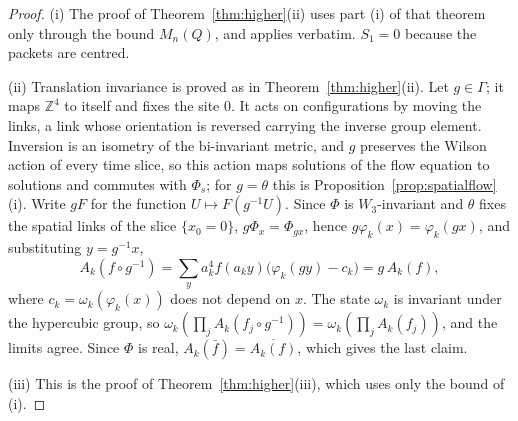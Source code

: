 \documentclass[aps,prd,twocolumn,superscriptaddress,nofootinbib,longbibliography,floatfix,amsmath,amssymb,10pt]{revtex4-2}
\theoremstyle{definition}
\theoremstyle{remark}
\newcommand{\Z}{\mathbb{Z}}
\begin{document}
\begin{proof}
(i) The proof of Theorem~\ref{thm:higher}(ii) uses part (i) of that theorem
only through the bound $M_n(Q)$, and applies verbatim. $S_1=0$ because the
packets are centred.

(ii) Translation invariance is proved as in Theorem~\ref{thm:higher}(ii). Let
$g\in\Gamma$; it maps $\Z^4$ to itself and fixes the site $0$. It acts on
configurations by moving the links, a link whose orientation is reversed
carrying the inverse group element. Inversion is an isometry of the
bi-invariant metric, and $g$ preserves the Wilson action of every time
slice, so this action maps solutions of the flow equation to solutions and
commutes with $\Phi_s$; for $g=\theta$ this is
Proposition~\ref{prop:spatialflow}(i). Write $gF$ for the function $U\mapsto
F(g^{-1}U)$. Since $\Phi$ is $W_3$-invariant and $\theta$ fixes the spatial
links of the slice $\{x_0=0\}$, $g\Phi_x=\Phi_{gx}$, hence
$g\varphi_k(x)=\varphi_k(gx)$, and substituting $y=g^{-1}x$,
\[
A_k(f\circ g^{-1})=\sum_ya_k^4f(a_ky)\bigl(\varphi_k(gy)-c_k\bigr)
=g\,A_k(f),
\]
where $c_k=\omega_k(\varphi_k(x))$ does not depend on $x$. The state
$\omega_k$ is invariant under the hypercubic group, so $\omega_k(\prod_j
A_k(f_j\circ g^{-1}))=\omega_k(\prod_jA_k(f_j))$, and the limits agree.
Since $\Phi$ is real, $A_k(\bar f)=\overline{A_k(f)}$, which gives the last
claim.

(iii) This is the proof of Theorem~\ref{thm:higher}(iii), which uses only
the bound of (i).


\end{proof}
\end{document}
